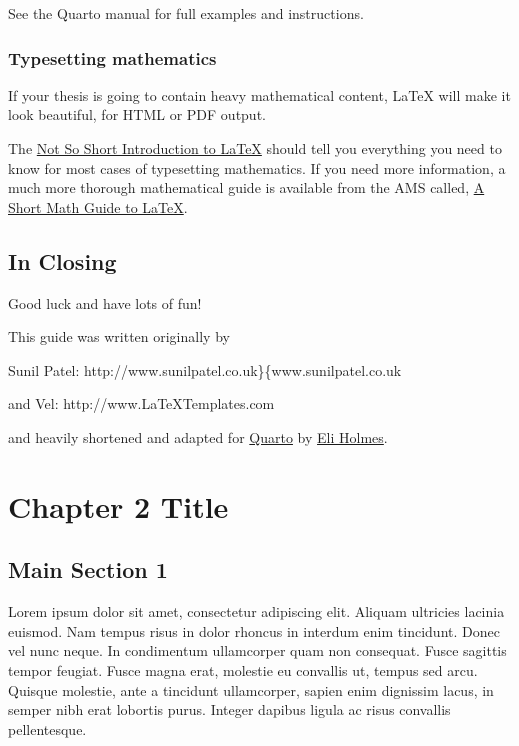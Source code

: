 \documentclass[
  letterpaper,
  11pt,
  english,
  singlespacing,
  headsepline]{MastersDoctoralThesis}
\begin{document}
See the Quarto manual for full examples and instructions.

\subsection{Typesetting mathematics}\label{typesetting-mathematics-1}

If your thesis is going to contain heavy mathematical content, \LaTeX{}
will make it look beautiful, for HTML or PDF output.

The
\href{http://www.ctan.org/tex-archive/info/lshort/english/lshort.pdf}{Not
So Short Introduction to LaTeX} should tell you everything you need to
know for most cases of typesetting mathematics. If you need more
information, a much more thorough mathematical guide is available from
the AMS called,
\href{http://tug.ctan.org/info/short-math-guide/short-math-guide.pdf}{A
Short Math Guide to LaTeX}.

\section{In Closing}\label{in-closing-1}

Good luck and have lots of fun!

This guide was written originally by

Sunil Patel: http://www.sunilpatel.co.uk\}\{www.sunilpatel.co.uk

and Vel: http://www.LaTeXTemplates.com

and heavily shortened and adapted for \href{https://quarto.org/}{Quarto}
by \href{https://eeholmes.github.io}{Eli Holmes}.


\chapter{Chapter 2 Title}\label{sec-Chapter2}

\section{Main Section 1}\label{main-section-1}

Lorem ipsum dolor sit amet, consectetur adipiscing elit. Aliquam
ultricies lacinia euismod. Nam tempus risus in dolor rhoncus in interdum
enim tincidunt. Donec vel nunc neque. In condimentum ullamcorper quam
non consequat. Fusce sagittis tempor feugiat. Fusce magna erat, molestie
eu convallis ut, tempus sed arcu. Quisque molestie, ante a tincidunt
ullamcorper, sapien enim dignissim lacus, in semper nibh erat lobortis
purus. Integer dapibus ligula ac risus convallis pellentesque.
\end{document}
